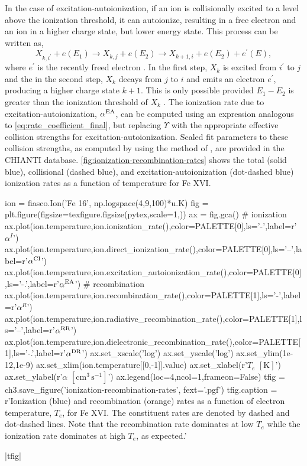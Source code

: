 In the case of excitation-autoionization, if an ion is collisionally excited to a level above the ionization threshold, it can autoionize, resulting in a free electron and an ion in a higher charge state, but lower energy state. This process can be written as,
\begin{equation}\label{eq:excitation_autoionization}
    X_{k,i^\prime} + e(E_1) \to X_{k,j} + e(E_2) \to X_{k+1,i} + e(E_2) + e^\prime(E),
\end{equation}
where $e^\prime$ is the recently freed electron \citep{phillips_ultraviolet_2008}. In the first step, $X_k$ is excited from $i^\prime$ to $j$ and the in the second step, $X_k$ decays from $j$ to $i$ and emits an electron $e^\prime$, producing a higher charge state $k+1$. This is only possible provided $E_1 - E_2$ is greater than the ionization threshold of $X_k$ \citep{bradshaw_collisional_2013}. The ionization rate due to excitation-autoionization, $\alpha^\textup{EA}$, can be computed using an expression analogous to \autoref{eq:rate_coefficient_final}, but replacing $\Upsilon$ with the appropriate effective collision strengths for excitation-autoionization. Scaled fit parameters to these collision strengths, as computed by \citet{dere_ionization_2007} using the method of \citet{burgess_analysis_1992}, are provided in the CHIANTI database. \autoref{fig:ionization-recombination-rates} shows the total (solid blue), collisional (dashed blue), and excitation-autoionization (dot-dashed blue) ionization rates as a function of temperature for Fe XVI.   

\begin{pycode}[chapter3]
ion = fiasco.Ion('Fe 16', np.logspace(4,9,100)*u.K)
fig = plt.figure(figsize=texfigure.figsize(pytex,scale=1,))
ax = fig.gca()
# ionization
ax.plot(ion.temperature,ion.ionization_rate(),color=PALETTE[0],ls='-',label=r'$\alpha^I$')
ax.plot(ion.temperature,ion.direct_ionization_rate(),color=PALETTE[0],ls='--',label=r'$\alpha^\textup{CI}$')
ax.plot(ion.temperature,ion.excitation_autoionization_rate(),color=PALETTE[0],ls='-.',label=r'$\alpha^\textup{EA}$')
# recombination
ax.plot(ion.temperature,ion.recombination_rate(),color=PALETTE[1],ls='-',label=r'$\alpha^R$')
ax.plot(ion.temperature,ion.radiative_recombination_rate(),color=PALETTE[1],ls='--',label=r'$\alpha^\textup{RR}$')
ax.plot(ion.temperature,ion.dielectronic_recombination_rate(),color=PALETTE[1],ls='-.',label=r'$\alpha^\textup{DR}$')
ax.set_xscale('log')
ax.set_yscale('log')
ax.set_ylim(1e-12,1e-9)
ax.set_xlim(ion.temperature[[0,-1]].value)
ax.set_xlabel(r'$T_e$ $[\si{\kelvin}]$')
ax.set_ylabel(r'$\alpha$ $[\si{\cm}^3\,\si{\second}^{-1}]$')
ax.legend(loc=4,ncol=1,frameon=False)
tfig = ch3.save_figure('ionization-recombination-rates', fext='.pgf')
tfig.caption = r'Ionization (blue) and recombination (orange) rates as a function of electron temperature, $T_e$, for Fe XVI. The constituent rates are denoted by dashed and dot-dashed lines. Note that the recombination rate dominates at low $T_e$ while the ionization rate dominates at high $T_e$, as expected.'
\end{pycode}
\py[chapter3]|tfig|


